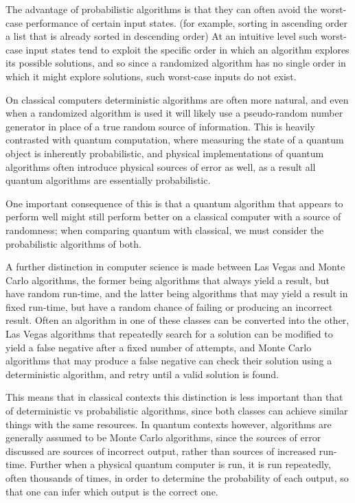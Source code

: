 \documentclass[]{article}
\begin{document}
The advantage of probabilistic algorithms is that they can often avoid the worst-case performance of certain input states. (for example, sorting in ascending order a list that is already sorted in descending order) At an intuitive level such worst-case input states tend to exploit the specific order in which an algorithm explores its possible solutions, and so since a randomized algorithm has no single order in which it might explore solutions, such worst-case inputs do not exist.

On classical computers deterministic algorithms are often more natural, and even when a randomized algorithm is used it will likely use a pseudo-random number generator in place of a true random source of information. This is heavily contrasted with quantum computation, where measuring the state of a quantum object is inherently probabilistic, and physical implementations of quantum algorithms often introduce physical sources of error as well, as a result all quantum algorithms are essentially probabilistic.

One important consequence of this is that a quantum algorithm that appears to perform well might still perform better on a classical computer with a source of randomness; when comparing quantum with classical, we must consider the probabilistic algorithms of both.

A further distinction in computer science is made between Las Vegas and Monte Carlo algorithms, the former being algorithms that always yield a result, but have random run-time, and the latter being algorithms that may yield a result in fixed run-time, but have a random chance of failing or producing an incorrect result. Often an algorithm in one of these classes can be converted into the other, Las Vegas algorithms that repeatedly search for a solution can be modified to yield a false negative after a fixed number of attempts, and Monte Carlo algorithms that may produce a false negative can check their solution using a deterministic algorithm, and retry until a valid solution is found.

This means that in classical contexts this distinction is less important than that of deterministic vs probabilistic algorithms, since both classes can achieve similar things with the same resources. In quantum contexts however, algorithms are generally assumed to be Monte Carlo algorithms, since the sources of error discussed are sources of incorrect output, rather than sources of increased run-time. Further when a physical quantum computer is run, it is run repeatedly, often thousands of times, in order to determine the probability of each output, so that one can infer which output is the correct one.
\end{document}
